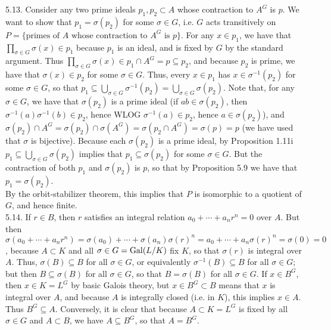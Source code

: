 \documentclass[11pt]{article}
\begin{document}
\num{5.13.} Consider any two prime ideals $p_1,p_2\subset A$ whose contraction
to $A^G$ is $p$. We want to show that $p_1=\sigma(p_2)$ for some $\sigma\in
G$, i.e. $G$ acts transitively on $P=\{\text{primes of $A$ whose contraction
to $A^G$ is $p$}\}$. For any $x\in p_1$, we have that $\prod_{\sigma\in
G}\sigma(x)\in p_1$ because $p_1$ is an ideal, and is fixed by $G$ by the
standard argument. Thus $\prod_{\sigma\in G}\sigma(x)\in p_1\cap A^G=p\subseteq
p_2$, and because $p_2$ is prime, we have that $\sigma(x)\in p_2$ for
some $\sigma\in G$. Thus, every $x\in p_1$ has $x\in \sigma^{-1}(p_2)$
for some $\sigma\in G$, so that $p_1\subseteq\bigcup_{\sigma\in
G}\sigma^{-1}(p_2)=\bigcup_{\sigma\in G}\sigma(p_2)$. Note that,
for any $\sigma\in G$, we have that $\sigma(p_2)$ is a prime ideal (if
$ab\in\sigma(p_2)$, then $\sigma^{-1}(a)\sigma^{-1}(b)\in p_2$, hence WLOG
$\sigma^{-1}(a)\in p_2$, hence $a\in \sigma(p_2)$), and $\sigma(p_2)\cap
A^G=\sigma(p_2)\cap\sigma(A^G)=\sigma(p_2\cap A^G)=\sigma(p)=p$ (we have used
that $\sigma$ is bijective). Because each $\sigma(p_2)$ is a prime ideal,
by Proposition 1.11i $p_1\subseteq\bigcup_{\sigma\in G}\sigma(p_2)$ implies
that $p_1\subseteq\sigma(p_2)$ for some $\sigma\in G$. But the contraction
of both $p_1$ and $\sigma(p_2)$ is $p$, so that by Proposition 5.9 we have
that $p_1=\sigma(p_2)$.\\

By the orbit-stabilizer theorem, this implies that $P$ is isomorphic to a
quotient of $G$, and hence finite.\\

\num{5.14.} If $r\in B$, then $r$ satisfies an
integral relation $a_0+\cdots+a_nr^n=0$ over $A$. But then
$\sigma(a_0+\cdots+a_nr^n)=\sigma(a_0)+\cdots+\sigma(a_n)\sigma(r)^n=a_0+\cdots+a_n\sigma(r)^n=\sigma(0)=0$,
because $A\subset K$ and all $\sigma\in G=\operatorname{Gal}(L/K)$ fix $K$, so that
$\sigma(r)$ is integral over $A$. Thus, $\sigma(B)\subseteq B$ for
all $\sigma\in G$, or equivalently $\sigma^{-1}(B)\subseteq B$ for all
$\sigma\in G$; but then $B\subseteq \sigma(B)$ for all $\sigma\in G$,
so that $B=\sigma(B)$ for all $\sigma\in G$. If $x\in B^G$, then $x\in
K=L^G$ by basic Galois theory, but $x\in B^G\subset B$ means that $x$
is integral over $A$, and because $A$ is integrally closed (i.e. in $K$),
this implies $x\in A$. Thus $B^G\subseteq A$. Conversely, it is clear that
because $A\subset K=L^G$ is fixed by all $\sigma\in G$ and $A\subset B$,
we have $A\subseteq B^G$, so that $A=B^G$.     \\
\end{document}
